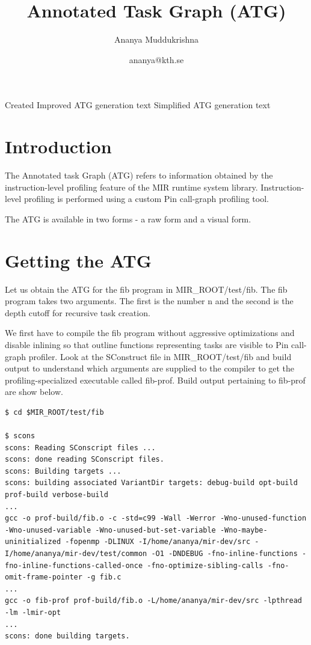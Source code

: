 \documentclass[11pt,a4paper,notitlepage]{article}
\author{Ananya Muddukrishna}
\date{ananya@kth.se}
\title{Annotated Task Graph (ATG)}
\begin{document}
\maketitle

\begin{versionhistory}
 {Created}
 {Improved ATG generation text}
 {Simplified ATG generation text}
\end{versionhistory}

\section{Introduction}
The Annotated task Graph (ATG) refers to information obtained by the instruction-level profiling feature of the MIR runtime system library.
Instruction-level profiling is performed using a custom Pin call-graph profiling tool.

The ATG is available in two forms - a raw form and a visual form.

\section{Getting the ATG}
\label{sec:getting-atg}
Let us obtain the ATG for the fib program in MIR\_ROOT/test/fib.
The fib program takes two arguments. The first is the number n and the second is the depth cutoff for recursive task creation.

We first have to compile the fib program without aggressive optimizations and disable inlining so that outline functions representing tasks are visible to Pin call-graph profiler. 
Look at the SConstruct file in MIR\_ROOT/test/fib and build output to understand which arguments are supplied to the compiler to get the profiling-specialized executable called fib-prof. 
Build output pertaining to fib-prof are show below.

\begin{lstlisting}[style=BashInputStyle]
$ cd $MIR_ROOT/test/fib

$ scons 
scons: Reading SConscript files ...
scons: done reading SConscript files.
scons: Building targets ...
scons: building associated VariantDir targets: debug-build opt-build prof-build verbose-build
...
gcc -o prof-build/fib.o -c -std=c99 -Wall -Werror -Wno-unused-function -Wno-unused-variable -Wno-unused-but-set-variable -Wno-maybe-uninitialized -fopenmp -DLINUX -I/home/ananya/mir-dev/src -I/home/ananya/mir-dev/test/common -O1 -DNDEBUG -fno-inline-functions -fno-inline-functions-called-once -fno-optimize-sibling-calls -fno-omit-frame-pointer -g fib.c
...
gcc -o fib-prof prof-build/fib.o -L/home/ananya/mir-dev/src -lpthread -lm -lmir-opt
...
scons: done building targets.
\end{lstlisting}
\end{document}
